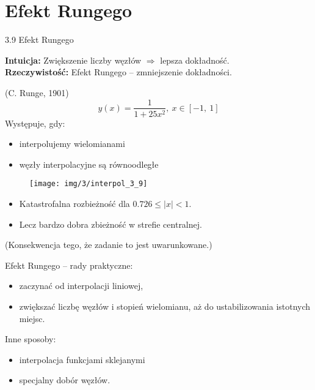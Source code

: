 \section{Efekt Rungego}
\begin{frame}
{3.9 Efekt Rungego}

\begin{block}{}
	\textbf{Intuicja: } Zwiększenie liczby węzłów $\Rightarrow$ lepsza dokładność. \\
	\textbf{Rzeczywistość: } Efekt Rungego -- zmniejszenie dokładności.
\end{block}

(C. Runge, 1901)
$$
y(x)=\frac{1}{1+25x^{2}},\ x\in[-1,\ 1]
$$
Występuje, gdy:
\begin{itemize}
\item interpolujemy wielomianami

\item węzły interpolacyjne są równoodległe
\end{itemize}
\end{frame}

\begin{frame}
	\begin{figure}[h]
		\texttt{[image: img/3/interpol\_3\_9]}
	\end{figure}
\end{frame}

\begin{frame}
\begin{itemize}
\item Katastrofalna rozbieżność dla $0.726\leq|x|<1$.

\item Lecz bardzo dobra zbieżność w strefie centralnej.
\end{itemize}

(Konsekwencja tego, że zadanie to jest { uwarunkowane}.)
\vspace{0.5cm}

Efekt Rungego -- rady praktyczne:

\begin{itemize}
\item zaczynać od interpolacji liniowej,

\item zwiększać liczbę węzłów i stopień wielomianu, aż do ustabilizowania istotnych miejsc.
\end{itemize}
\vspace{0.5cm}
Inne sposoby:
\begin{itemize}
\item interpolacja funkcjami sklejanymi
\item specjalny dobór węzłów.
\end{itemize}

\end{frame}
